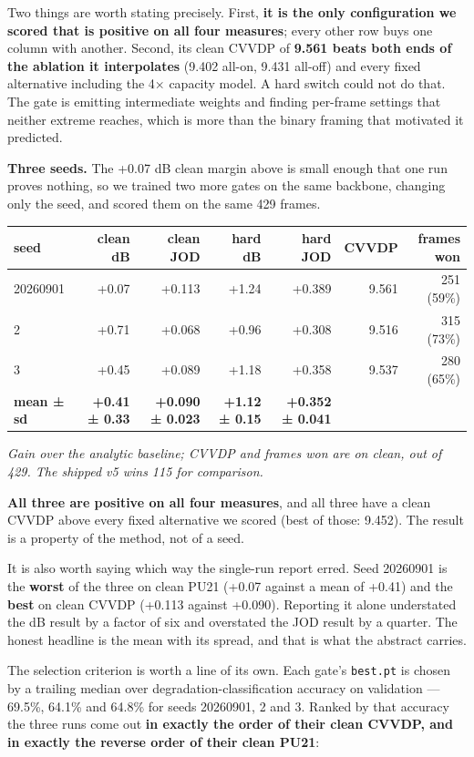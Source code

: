 Two things are worth stating precisely. First, \textbf{it is the only configuration we
scored that is positive on all four measures}; every other row buys one column
with another. Second, its clean CVVDP of \textbf{9.561 beats both ends of the
ablation it interpolates} (9.402 all-on, 9.431 all-off) and every fixed
alternative including the 4× capacity model. A hard switch could not do that. The
gate is emitting intermediate weights and finding per-frame settings that
neither extreme reaches, which is more than the binary framing that motivated it
predicted.

\textbf{Three seeds.} The +0.07 dB clean margin above is small enough that one run
proves nothing, so we trained two more gates on the same backbone, changing only
the seed, and scored them on the same 429 frames.

{\footnotesize
\begin{longtable}[]{@{}lrrrrrr@{}}
\toprule
seed & clean dB & clean JOD & hard dB & hard JOD & CVVDP & frames won\tabularnewline
\midrule
\endhead
20260901 & +0.07 & +0.113 & +1.24 & +0.389 & 9.561 & 251 (59\%)\tabularnewline
2 & +0.71 & +0.068 & +0.96 & +0.308 & 9.516 & 315 (73\%)\tabularnewline
3 & +0.45 & +0.089 & +1.18 & +0.358 & 9.537 & 280 (65\%)\tabularnewline
\textbf{mean ± sd} & \textbf{+0.41 ± 0.33} & \textbf{+0.090 ± 0.023} & \textbf{+1.12 ± 0.15} & \textbf{+0.352 ± 0.041} & &\tabularnewline
\bottomrule
\end{longtable}
}

\emph{Gain over the analytic baseline; CVVDP and frames won are on clean, out of
429. The shipped v5 wins 115 for comparison.}

\textbf{All three are positive on all four measures}, and all three have a clean
CVVDP above every fixed alternative we scored (best of those: 9.452). The
result is a property of the method, not of a seed.

It is also worth saying which way the single-run report erred. Seed 20260901 is
the \textbf{worst} of the three on clean PU21 (+0.07 against a mean of +0.41) and the
\textbf{best} on clean CVVDP (+0.113 against +0.090). Reporting it alone understated
the dB result by a factor of six and overstated the JOD result by a quarter. The
honest headline is the mean with its spread, and that is what the abstract
carries.

The selection criterion is worth a line of its own. Each gate's \texttt{best.pt} is
chosen by a trailing median over degradation-classification accuracy on
validation --- 69.5\%, 64.1\% and 64.8\% for seeds 20260901, 2 and 3. Ranked by that
accuracy the three runs come out \textbf{in exactly the order of their clean CVVDP,
and in exactly the reverse order of their clean PU21}:

